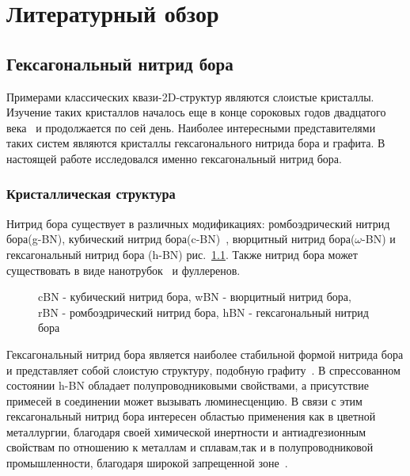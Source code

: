 \chapter{Литературный обзор} \label{chapt1}

\section{Гексагональный нитрид бора} \label{sect1_1}
Примерами классических квази-2D-структур являются слоистые кристаллы.
Изучение таких кристаллов началось еще в конце сороковых годов
двадцатого века~\cite{Wallace1947} и продолжается по сей день.
Наиболее интересными представителями таких систем являются кристаллы
гексагонального нитрида бора и графита. В настоящей работе исследовался
именно гексагональный нитрид бора.
\subsection{Кристаллическая структура} \label{sect1_3_1}
Нитрид бора существует в различных модификациях: ромбоэдрический нитрид
бора(g-BN), кубический нитрид бора(c-BN)~\cite{Litvinov1998},
вюрцитный нитрид бора($\omega$-BN) и гексагональный нитрид бора
(h-BN) рис.~\ref{pic:BN_forms}. Также нитрид бора может существовать в виде нанотрубок~\cite{YZhi2009}
и фуллеренов.
\begin{figure}[!ht]
\caption{cBN - кубический нитрид бора, wBN - вюрцитный нитрид бора,
rBN - ромбоэдрический нитрид бора, hBN - гексагональный нитрид бора}
\label{pic:BN_forms}
\end{figure}


Гексагональный нитрид бора является наиболее стабильной формой нитрида
бора и представляет собой слоистую структуру, подобную графиту~\cite{
Neumann1995,Doni1969}. В спрессованном состоянии h-BN обладает 
полупроводниковыми свойствами, а присутствие примесей в соединении 
может вызывать люминесценцию. В связи с этим гексагональный нитрид 
бора интересен областью применения как в цветной металлургии, 
благодаря своей химической инертности и антиадгезионным свойствам по 
отношению к металлам и сплавам,так и в полупроводниковой 
промышленности, благодаря широкой запрещенной зоне~\cite{
Serzhantova2011}.




















